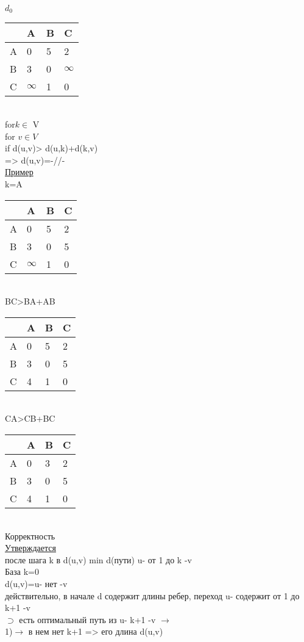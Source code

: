 \documentclass{article}
\begin{document}
$d_0$\\
\begin{tabular}{l|l l l}
& A &B&C\\
\hline
A& 0 &5 &2 \\
B& 3 & 0& $\infty$ \\
C& $\infty$ & 1&0\\
\end{tabular}\\
for$k\in$ V\\
for $v\in V$\\
if d(u,v)> d(u,k)+d(k,v)\\
=> d(u,v)=-//-\\
\underline{Пример}\\
k=A\\
\begin{tabular}{l|l l l}
& A &B&C\\
\hline
A& 0 &5 &2 \\
B& 3 & 0& 5 \\
C& $\infty$ & 1&0\\
\end{tabular}\\
BC>BA+AB\\
\begin{tabular}{l|l l l}
& A &B&C\\
\hline
A& 0 &5 &2 \\
B& 3 & 0& 5 \\
C& 4& 1&0\\
\end{tabular}\\
CA>CB+BC\\
\begin{tabular}{l|l l l}
& A &B&C\\
\hline
A& 0 & 3 & 2\\
B& 3 & 0 & 5\\
C& 4 & 1 & 0\\
\end{tabular}\\
Корректность\\
\underline{Утверждается}\\
после шага k в d(u,v) min d(пути) u- от 1 до k -v\\
База k=0\\
d(u,v)=u- нет -v\\
действительно, в начале d содержит длины ребер, переход u- содержит от 1 до k+1 -v\\
$\supset$ есть оптимальный путь из u- k+1 -v $\rightarrow$\\
1)$\rightarrow$ в нем нет k+1 => его длина d(u,v)\\
\end{document}

